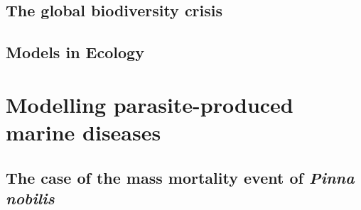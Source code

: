 \documentclass[
	10pt, %
	fleqn, %
	a4paper, %
]{LegrandOrangeBook}
\begin{document}
\chapterspaceabove{6.75cm}
\chapterspacebelow{7.25cm}

\chapter{The global biodiversity crisis}


\chapterspaceabove{6.75cm}
\chapterspacebelow{7.25cm}

\chapter{Models in Ecology}


{
	\hypersetup{hidelinks}
	\part{Modelling parasite-produced marine diseases}
}


\chapterspaceabove{7.75cm}
\chapterspacebelow{7.25cm}

\chapter{The case of the mass mortality event of \textit{Pinna nobilis}}
%

\chapterspaceabove{6.75cm}
\chapterspacebelow{7.25cm}
\end{document}
